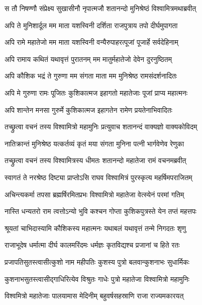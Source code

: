 \twolineshloka
{स तौ निषण्णौ संप्रेक्ष्य सुखासीनौ नृपात्मजौ}
{शतानन्दो मुनिश्रेष्ठं विश्वामित्रमथाब्रवीत्} %

\twolineshloka
{अपि ते मुनिशार्दूल मम माता यशस्विनी}
{दर्शिता राजपुत्राय तपो दीर्घमुपागता} %

\twolineshloka
{अपि रामे महातेजो मम माता यशस्विनी}
{वन्यैरुपाहरत्पूजां पूजार्हे सर्वदेहिनाम्} %

\twolineshloka
{अपि रामाय कथितं यथावृत्तं पुरातनम्}
{मम मातुर्महातेजो देवेन दुरनुष्ठितम्} %

\twolineshloka
{अपि कौशिक भद्रं ते गुरुणा मम संगता}
{माता मम मुनिश्रेष्ठ रामसंदर्शनादितः} %

\twolineshloka
{अपि मे गुरुणा रामः पूजितः कुशिकात्मज}
{इहागतो महातेजाः पूजां प्राप्य महात्मनः} %

\twolineshloka
{अपि शान्तेन मनसा गुरुर्मे कुशिकात्मज}
{इहागतेन रामेण प्रयतेनाभिवादितः} %

\twolineshloka
{तच्छ्रुत्वा वचनं तस्य विश्वामित्रो महामुनिः}
{प्रत्युवाच शतानन्दं वाक्यज्ञो वाक्यकोविदम्} %

\twolineshloka
{नातिक्रान्तं मुनिश्रेष्ठ यत्कर्तव्यं कृतं मया}
{संगता मुनिना पत्नी भार्गवेणेव रेणुका} %

\twolineshloka
{तच्छ्रुत्वा वचनं तस्य विश्वामित्रस्य धीमतः}
{शतानन्दो महातेजा रामं वचनमब्रवीत्} %

\twolineshloka
{स्वागतं ते नरश्रेष्ठ दिष्ट्या प्राप्तोऽसि राघव}
{विश्वामित्रं पुरस्कृत्य महर्षिमपराजितम्} %

\twolineshloka
{अचिन्त्यकर्मा तपसा ब्रह्मर्षिरमितप्रभः}
{विश्वामित्रो महातेजा वेत्स्येनं परमां गतिम्} %

\twolineshloka
{नास्ति धन्यतरो राम त्वत्तोऽन्यो भुवि कश्चन}
{गोप्ता कुशिकपुत्रस्ते येन तप्तं महत्तपः} %

\twolineshloka
{श्रूयतां चाभिदास्यामि कौशिकस्य महात्मनः}
{यथाबलं यथावृत्तं तन्मे निगदतः शृणु} %

\twolineshloka
{राजाभूदेष धर्मात्मा दीर्घ कालमरिंदमः}
{धर्मज्ञः कृतविद्यश्च प्रजानां च हिते रतः} %

\twolineshloka
{प्रजापतिसुतस्त्वासीत्कुशो नाम महीपतिः}
{कुशस्य पुत्रो बलवान्कुशनाभः सुधार्मिकः} %

\twolineshloka
{कुशनाभसुतस्त्वासीद्गाधिरित्येव विश्रुतः}
{गाधेः पुत्रो महातेजा विश्वामित्रो महामुनिः} %

\twolineshloka
{विश्वमित्रो महातेजाः पालयामास मेदिनीम्}
{बहुवर्षसहस्राणि राजा राज्यमकारयत्} %

